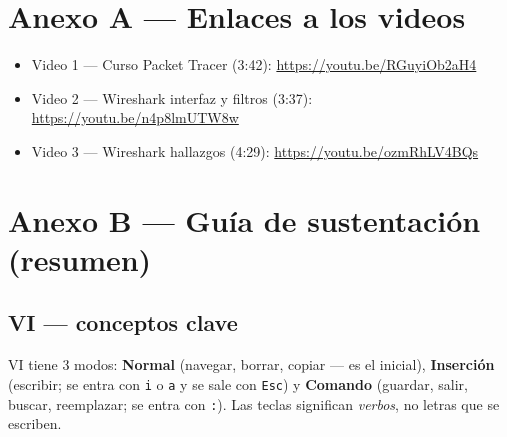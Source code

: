 \appendix
\chapter{Anexo A --- Enlaces a los videos}

\begin{itemize}
  \item Video 1 --- Curso Packet Tracer (3:42): \href{https://youtu.be/RGuyiOb2aH4}{\url{https://youtu.be/RGuyiOb2aH4}}
  \item Video 2 --- Wireshark interfaz y filtros (3:37): \href{https://youtu.be/n4p8lmUTW8w}{\url{https://youtu.be/n4p8lmUTW8w}}
  \item Video 3 --- Wireshark hallazgos (4:29): \href{https://youtu.be/ozmRhLV4BQs}{\url{https://youtu.be/ozmRhLV4BQs}}
\end{itemize}

\chapter{Anexo B --- Guía de sustentación (resumen)}

\section{VI --- conceptos clave}

VI tiene 3 modos: \textbf{Normal} (navegar, borrar, copiar --- es el inicial), \textbf{Inserción} (escribir; se entra con \texttt{i} o \texttt{a} y se sale con \texttt{Esc}) y \textbf{Comando} (guardar, salir, buscar, reemplazar; se entra con \texttt{:}). Las teclas significan \emph{verbos}, no letras que se escriben.

